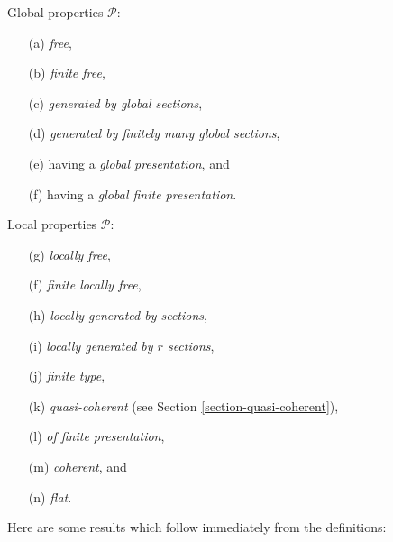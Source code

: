 \medskip\noindent
Global properties $\mathcal{P}$:
\begin{enumerate}
\item[(a)] {\it free},
\item[(b)] {\it finite free},
\item[(c)] {\it generated by global sections},
\item[(d)] {\it generated by finitely many global sections},
\item[(e)] having a {\it global presentation}, and
\item[(f)] having a {\it global finite presentation}.
\end{enumerate}
Local properties $\mathcal{P}$:
\begin{enumerate}
\item[(g)] {\it locally free},
\item[(f)] {\it finite locally free},
\item[(h)] {\it locally generated by sections},
\item[(i)] {\it locally generated by $r$ sections},
\item[(j)] {\it finite type},
\item[(k)] {\it quasi-coherent} (see Section \ref{section-quasi-coherent}),
\item[(l)] {\it of finite presentation},
\item[(m)] {\it coherent}, and
\item[(n)] {\it flat}.
\end{enumerate}
Here are some results which follow immediately from the definitions:
